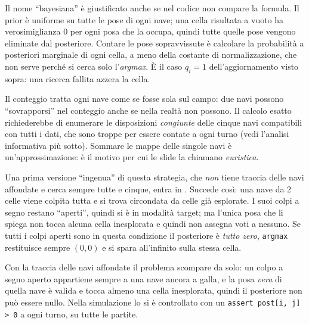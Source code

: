 \begin{osservazione}
Il nome ``bayesiana'' è giustificato anche se nel codice non compare la formula. Il
prior è uniforme su tutte le pose di ogni nave; una cella risultata a vuoto ha
verosimiglianza $0$ per ogni posa che la occupa, quindi tutte quelle pose vengono eliminate
dal posteriore. Contare le pose sopravvissute è calcolare la probabilità a posteriori
marginale di ogni cella, a meno della costante di normalizzazione, che non serve perché
si cerca solo l'\emph{argmax}. È il caso $q_i = 1$ dell'aggiornamento visto sopra: una
ricerca fallita azzera la cella.
\end{osservazione}

\begin{attenzione}
Il conteggio tratta ogni nave come se fosse sola sul campo: due navi possono
``sovrapporsi'' nel conteggio anche se nella realtà non possono. Il calcolo esatto
richiederebbe di enumerare le disposizioni \emph{congiunte} delle cinque navi compatibili
con tutti i dati, che sono troppe per essere contate a ogni turno (vedi l'analisi
informativa più sotto). Sommare le mappe delle singole navi è un'approssimazione: è il
motivo per cui le slide la chiamano \emph{euristica}.
\end{attenzione}

\begin{attenzione}
Una prima versione ``ingenua'' di questa strategia, che \emph{non} tiene traccia delle
navi affondate e cerca sempre tutte e cinque, entra in . Succede così:
una nave da 2 celle viene colpita tutta e si trova circondata da celle già esplorate. I
suoi colpi a segno restano ``aperti'', quindi si è in modalità target; ma l'unica posa che
li spiega non tocca alcuna cella inesplorata e quindi non assegna voti a nessuno. Se tutti
i colpi aperti sono in questa condizione il posteriore è \emph{tutto zero},
\texttt{argmax} restituisce sempre $(0,0)$ e si spara all'infinito sulla stessa cella.

Con la traccia delle navi affondate il problema scompare da solo: un colpo a segno aperto
appartiene sempre a una nave ancora a galla, e la posa \emph{vera} di quella nave è
valida e tocca almeno una cella inesplorata, quindi il posteriore non può essere nullo.
Nella simulazione lo si è controllato con un \texttt{assert post[i, j] > 0} a ogni turno,
su tutte le partite.
\end{attenzione}

